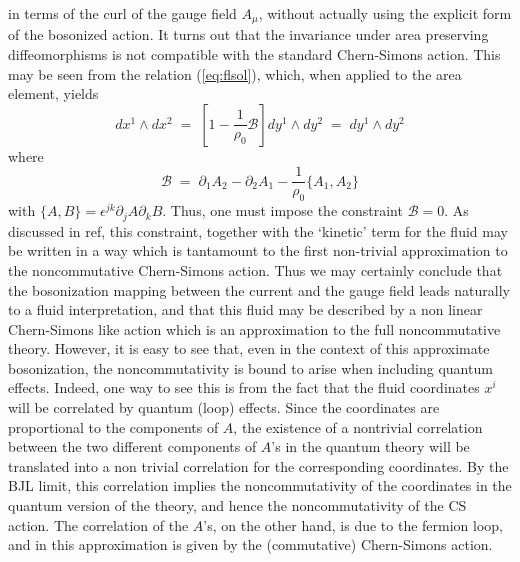 \documentclass[a4paper,12pt]{article}
\begin{document}
in
terms of the curl of the gauge field $A_\mu$, without actually
using the
explicit form of the bosonized action. It turns out that the
invariance under area preserving diffeomorphisms is not compatible
with the standard Chern-Simons action. This may be seen from the
relation (\ref{eq:flsol}), which, when applied to the area element,
yields
\begin{equation}
  \label{eq:apt1}
dx^1 \land dx^2 \;=\; [ 1 - \frac{1}{\rho_0} {\mathcal B} ] dy^1
\land dy^2
\;=\; dy^1 \land dy^2  
\end{equation}
where
\begin{equation}
  \label{eq:defcb}
{\mathcal B} \;=\; \partial_1 A_2 - \partial_2 A_1 -
\frac{1}{\rho_0} \{ A_1 , A_2 \} 
\end{equation}
with $\{A,B\}= \epsilon^{jk} \partial_j A \partial_k B$. Thus, one
must impose the constraint
${\mathcal B}=0$.  As discussed in ref\cite{susskind}, this
constraint, together with the `kinetic' term for the fluid may be
written in a way which is tantamount to the first non-trivial
approximation to the noncommutative Chern-Simons action. Thus we
may
certainly conclude that the bosonization mapping between the
current
and the gauge field leads naturally to a fluid interpretation, and
that this fluid may be described by a non linear Chern-Simons like
action which is an approximation to the full noncommutative theory.
However, it is easy to see that, even in the context of this
approximate bosonization, the noncommutativity is bound to arise
when
including quantum effects.  Indeed, one way to see this is from the
fact that the fluid coordinates $x^i$ will be correlated by quantum
(loop) effects.  Since the coordinates are proportional to the
components of $A$, the existence of a nontrivial correlation
between
the two different components of $A$'s in the quantum theory will be
translated into a non trivial correlation for the corresponding
coordinates.  By the BJL limit, this correlation implies the
noncommutativity of the coordinates in the quantum version of the
theory, and hence the noncommutativity of the CS action.  The
correlation of the $A$'s, on the other hand, is due to the fermion
loop, and in this approximation is given by the (commutative)
Chern-Simons action.
\end{document}
